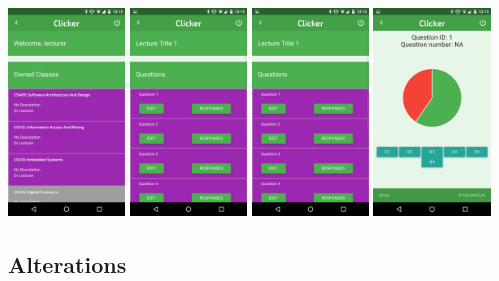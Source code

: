 \documentclass{article}
\begin{document}
\begin{center}
\includegraphics[width=3.1cm]{images/lecturerhome.png}
\includegraphics[width=3.1cm]{images/lecturerlectures.png}
\includegraphics[width=3.1cm]{images/lecturerquestions.png}
\includegraphics[width=3.1cm]{images/lecturerresponse.png}
\end{center}

\subsection{Alterations}
\end{document}
